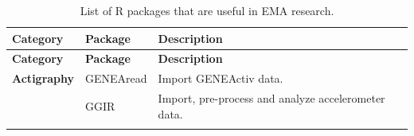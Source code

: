 \documentclass[]{book}
\begin{document}
\begin{longtable}[]{@{}lll@{}}
\caption{\label{tab:rcat} List of R packages that are useful in EMA
research.}\tabularnewline
\toprule
\begin{minipage}[b]{0.21\columnwidth}\raggedright\strut
\textbf{Category}\strut
\end{minipage} & \begin{minipage}[b]{0.23\columnwidth}\raggedright\strut
\textbf{Package}\strut
\end{minipage} & \begin{minipage}[b]{0.48\columnwidth}\raggedright\strut
\textbf{Description}\strut
\end{minipage}\tabularnewline
\midrule
\endfirsthead
\toprule
\begin{minipage}[b]{0.21\columnwidth}\raggedright\strut
\textbf{Category}\strut
\end{minipage} & \begin{minipage}[b]{0.23\columnwidth}\raggedright\strut
\textbf{Package}\strut
\end{minipage} & \begin{minipage}[b]{0.48\columnwidth}\raggedright\strut
\textbf{Description}\strut
\end{minipage}\tabularnewline
\midrule
\endhead
\begin{minipage}[t]{0.21\columnwidth}\raggedright\strut
\textbf{Actigraphy}\strut
\end{minipage} & \begin{minipage}[t]{0.23\columnwidth}\raggedright\strut
GENEAread\strut
\end{minipage} & \begin{minipage}[t]{0.48\columnwidth}\raggedright\strut
Import GENEActiv data.\strut
\end{minipage}\tabularnewline
\begin{minipage}[t]{0.21\columnwidth}\raggedright\strut
\strut
\end{minipage} & \begin{minipage}[t]{0.23\columnwidth}\raggedright\strut
GGIR\strut
\end{minipage} & \begin{minipage}[t]{0.48\columnwidth}\raggedright\strut
Import, pre-process and analyze accelerometer data.\strut
\end{minipage}\tabularnewline
\begin{minipage}[t]{0.21\columnwidth}\raggedright\strut
\strut
\end{minipage} & \begin{minipage}[t]{0.23\columnwidth}\raggedright\strut

\end{minipage}
\end{longtable}
\end{document}
